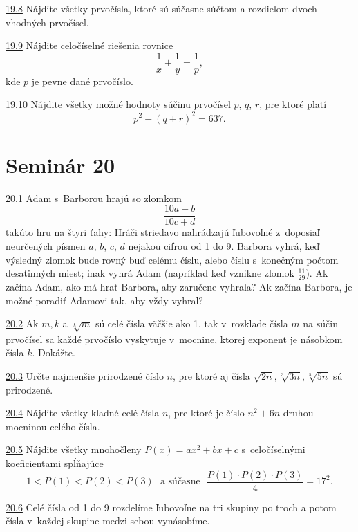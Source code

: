 \noindent \ul{19.8}  Nájdite všetky prvočísla, ktoré sú súčasne súčtom a rozdielom dvoch vhodných prvočísel.




\noindent \ul{19.9} \cite{Thiele1986} Nájdite celočíselné riešenia rovnice $$\frac{1}{x}+\frac{1}{y}=\frac{1}{p},$$ kde $p$ je pevne dané prvočíslo.




\noindent \ul{19.10} 
Nájdite všetky možné hodnoty súčinu prvočísel $p$, $q$, $r$, pre ktoré platí
$$p^2 - (q + r)^2= 637.$$




\section*{Seminár 20}

\noindent \ul{20.1} 
Adam s~Barborou hrajú so zlomkom
$$ \frac{10a + b}{10c + d}$$
takúto hru na štyri ťahy: Hráči striedavo nahrádzajú ľubovoľné z~doposiaľ neurčených písmen $a$, $b$, $c$, $d$ nejakou cifrou od 1 do 9. Barbora vyhrá, keď výsledný zlomok bude rovný buď celému číslu, alebo číslu s~konečným počtom desatinných miest; inak vyhrá Adam (napríklad keď vznikne zlomok $\frac{11}{29}$). Ak začína Adam, ako má hrať Barbora, aby zaručene vyhrala? Ak začína Barbora, je možné poradiť Adamovi tak, aby vždy vyhral?




\noindent \ul{20.2}  Ak $m, k$ a $\sqrt[k]{m}$ sú celé čísla väčšie ako 1, tak v~rozklade čísla $m$ na súčin prvočísel sa každé prvočíslo vyskytuje v~mocnine, ktorej exponent je násobkom čísla $k$. Dokážte.




\noindent \ul{20.3} 
Určte najmenšie prirodzené číslo $n$, pre ktoré aj čísla
$\sqrt{2n}, \sqrt[3]{3n}, \sqrt[5]{5n}$ sú prirodzené.




\noindent \ul{20.4} 
Nájdite všetky kladné celé čísla $n$, pre ktoré je číslo $n^2 + 6n$ druhou mocninou celého čísla.




\noindent \ul{20.5}  Nájdite všetky mnohočleny $P(x) = ax^2 +bx+c$ s~celočíselnými koeficientami spĺňajúce
$$1 < P(1) < P(2) < P(3) \ \ \ \text{a súčasne} \ \  \
\frac{P(1) \cdot P(2) \cdot P(3)}{4}= 17^2.$$




\noindent \ul{20.6} 
Celé čísla od 1 do 9 rozdelíme ľubovoľne na tri skupiny po troch a potom čísla v~každej skupine medzi sebou vynásobíme.

